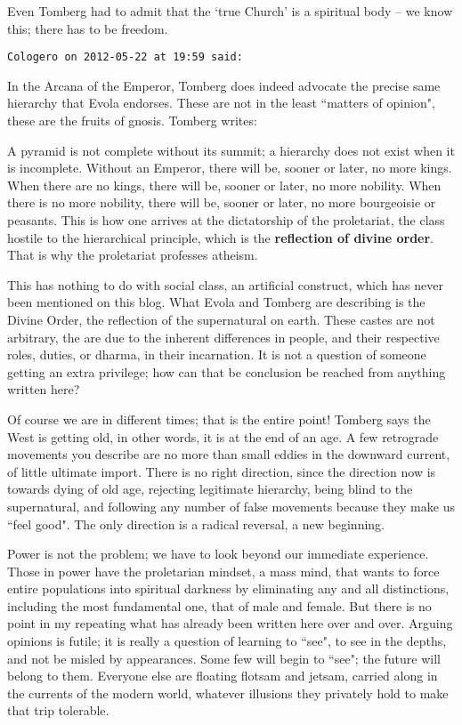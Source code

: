 \begin{footnotesize}
\begin{sffamily}
Even Tomberg had to admit that the `true Church' is a spiritual body – we know this; there has to be freedom.


\hfill

\texttt{Cologero on 2012-05-22 at 19:59 said: }

In the Arcana of the Emperor, Tomberg does indeed advocate the precise same hierarchy that Evola endorses. These are not in the least ``matters of opinion", these are the fruits of gnosis. Tomberg writes:

\begin{quotex}
A pyramid is not complete without its summit; a hierarchy does not exist when it is incomplete. Without an Emperor, there will be, sooner or later, no more kings. When there are no kings, there will be, sooner or later, no more nobility. When there is no more nobility, there will be, sooner or later, no more bourgeoisie or peasants. This is how one arrives at the dictatorship of the proletariat, the class hostile to the hierarchical principle, which is the \textbf{reflection of divine order}. That is why the proletariat professes atheism. 

\end{quotex}
This has nothing to do with social class, an artificial construct, which has never been mentioned on this blog. What Evola and Tomberg are describing is the Divine Order, the reflection of the supernatural on earth. These castes are not arbitrary, the are due to the inherent differences in people, and their respective roles, duties, or dharma, in their incarnation. It is not a question of someone getting an extra privilege; how can that be conclusion be reached from anything written here?

Of course we are in different times; that is the entire point! Tomberg says the West is getting old, in other words, it is at the end of an age. A few retrograde movements you describe are no more than small eddies in the downward current, of little ultimate import. There is no right direction, since the direction now is towards dying of old age, rejecting legitimate hierarchy, being blind to the supernatural, and following any number of false movements because they make us ``feel good". The only direction is a radical reversal, a new beginning.

Power is not the problem; we have to look beyond our immediate experience. Those in power have the proletarian mindset, a mass mind, that wants to force entire populations into spiritual darkness by eliminating any and all distinctions, including the most fundamental one, that of male and female. But there is no point in my repeating what has already been written here over and over. Arguing opinions is futile; it is really a question of learning to ``see", to see in the depths, and not be misled by appearances. Some few will begin to ``see"; the future will belong to them. Everyone else are floating flotsam and jetsam, carried along in the currents of the modern world, whatever illusions they privately hold to make that trip tolerable.



\end{sffamily}
\end{footnotesize}
